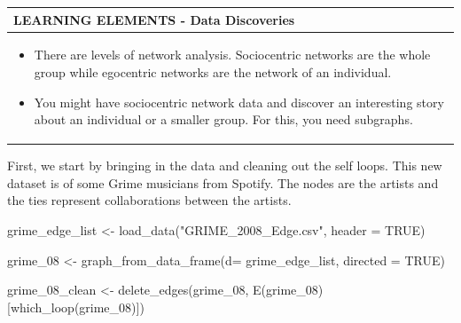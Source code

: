 \documentclass[
  letterpaper,
  DIV=11,
  numbers=noendperiod]{scrreprt}
\newenvironment{Shaded}{\begin{snugshade}}{\end{snugshade}}
\newcommand{\AttributeTok}[1]{\textcolor[rgb]{0.40,0.45,0.13}{#1}}
\newcommand{\ConstantTok}[1]{\textcolor[rgb]{0.56,0.35,0.01}{#1}}
\newcommand{\FunctionTok}[1]{\textcolor[rgb]{0.28,0.35,0.67}{#1}}
\newcommand{\NormalTok}[1]{\textcolor[rgb]{0.00,0.23,0.31}{#1}}
\newcommand{\OtherTok}[1]{\textcolor[rgb]{0.00,0.23,0.31}{#1}}
\newcommand{\StringTok}[1]{\textcolor[rgb]{0.13,0.47,0.30}{#1}}
\begin{document}
\begin{longtable}[]{@{}
  >{\raggedright\arraybackslash}p{}@{}}
\toprule\noalign{}
\begin{minipage}[b]{\linewidth}\raggedright
\textbf{LEARNING ELEMENTS - Data Discoveries}
\end{minipage} \\
\midrule\noalign{}
\endhead
\bottomrule\noalign{}
\endlastfoot
\begin{minipage}[t]{\linewidth}\raggedright
\begin{itemize}
\item
  There are levels of network analysis. Sociocentric networks are the
  whole group while egocentric networks are the network of an
  individual.
\item
  You might have sociocentric network data and discover an interesting
  story about an individual or a smaller group. For this, you need
  subgraphs.
\end{itemize}
\end{minipage} \\
\end{longtable}

First, we start by bringing in the data and cleaning out the self loops.
This new dataset is of some Grime musicians from Spotify. The nodes are
the artists and the ties represent collaborations between the artists.

\begin{Shaded}
\begin{Highlighting}[]
\NormalTok{grime\_edge\_list }\OtherTok{\textless{}{-}} \FunctionTok{load\_data}\NormalTok{(}\StringTok{"GRIME\_2008\_Edge.csv"}\NormalTok{, }\AttributeTok{header =} \ConstantTok{TRUE}\NormalTok{)}

\NormalTok{grime\_08 }\OtherTok{\textless{}{-}} \FunctionTok{graph\_from\_data\_frame}\NormalTok{(}\AttributeTok{d=}\NormalTok{ grime\_edge\_list, }\AttributeTok{directed =} \ConstantTok{TRUE}\NormalTok{)}
\end{Highlighting}
\end{Shaded}

\begin{Shaded}
\begin{Highlighting}[]
\NormalTok{grime\_08\_clean }\OtherTok{\textless{}{-}} \FunctionTok{delete\_edges}\NormalTok{(grime\_08, }\FunctionTok{E}\NormalTok{(grime\_08)[}\FunctionTok{which\_loop}\NormalTok{(grime\_08)])}
\end{Highlighting}
\end{Shaded}
\end{document}
